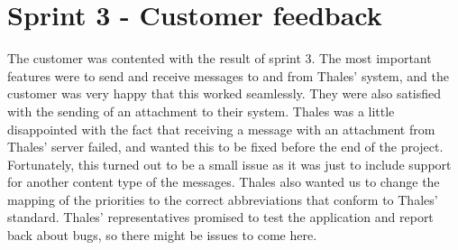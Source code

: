 \section{Sprint 3 - Customer feedback}

The customer was contented with the result of sprint 3. The most important features were to send and receive messages to and from Thales' system, and the customer was very happy that this worked seamlessly. They were also satisfied with the sending of an attachment to their system.
\newline
\newline
Thales was a little disappointed with the fact that receiving a message with an attachment from Thales' server failed, and wanted this to be fixed before the end of the project. Fortunately, this turned out to be a small issue as it was just to include support for another content type of the messages. Thales also wanted us to change the mapping of the priorities to the correct abbreviations that conform to Thales' standard. 
\newline
\newline
Thales' representatives promised to test the application and report back about bugs, so there might be issues to come here.

